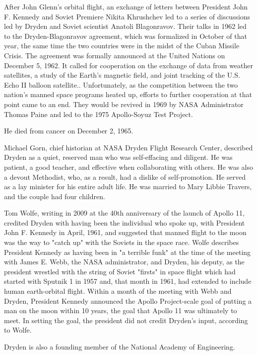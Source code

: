 After John Glenn's orbital flight, an exchange of letters between
President John F. Kennedy and Soviet Premiere Nikita Khrushchev led to a
series of discussions led by Dryden and Soviet scientist Anatoli
Blagonravov. Their talks in 1962 led to the Dryden-Blagonravov
agreement, which was formalized in October of that year, the same time
the two countries were in the midst of the Cuban Missile Crisis. The
agreement was formally announced at the United Nations on December 5,
1962. It called for cooperation on the exchange of data from weather
satellites, a study of the Earth's magnetic field, and joint tracking of
the U.S. Echo II balloon satellite.. Unfortunately, as the competition
between the two nation's manned space programs heated up, efforts to
further cooperation at that point came to an end. They would be revived
in 1969 by NASA Administrator Thomas Paine and led to the 1975
Apollo-Soyuz Test Project.

He died from cancer on December 2, 1965.

Michael Gorn, chief historian at NASA Dryden Flight Research Center,
described Dryden as a quiet, reserved man who was self-effacing and
diligent. He was patient, a good teacher, and effective when
collaborating with others. He was also a devout Methodist, who, as a
result, had a dislike of self-promotion. He served as a lay minister for
his entire adult life. He was married to Mary Libbie Travers, and the
couple had four children.

Tom Wolfe, writing in 2009 at the 40th anniversary of the launch of
Apollo 11, credited Dryden with having been the individual who spoke up,
with President John F. Kennedy in April, 1961, and suggested that manned
flight to the moon was the way to "catch up" with the Soviets in the
space race. Wolfe describes President Kennedy as having been in "a
terrible funk" at the time of the meeting with James E. Webb, the NASA
administrator, and Dryden, his deputy, as the president wrestled with
the string of Soviet "firsts" in space flight which had started with
Sputnik 1 in 1957 and, that month in 1961, had extended to include human
earth-orbital flight. Within a month of the meeting with Webb and
Dryden, President Kennedy announced the Apollo Project-scale goal of
putting a man on the moon within 10 years, the goal that Apollo 11 was
ultimately to meet. In setting the goal, the president did not credit
Dryden's input, according to Wolfe.

Dryden is also a founding member of the National Academy of Engineering.

